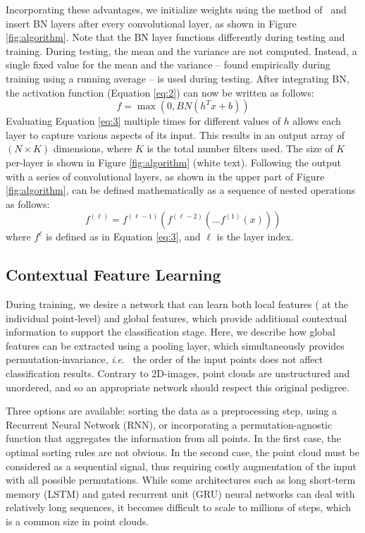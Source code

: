 \documentclass[final,3p,times,twocolumn,authoryear]{elsarticle}
\newcommand{\ie}{\textit{i}.\textit{e}.}
\begin{document}
Incorporating these advantages, we initialize weights using the method of~\citet{pmlr-glorot10a} and insert BN layers after every convolutional layer, as shown in Figure \ref{fig:algorithm}. 
Note that the BN layer functions differently during testing and training. 
During testing, the mean and the variance are not computed. 
Instead, a single fixed value for the mean and the variance -- found empirically during training using a running average -- is used during testing. 
After integrating BN, the activation function (Equation \ref{eq:2}) can now be written as follows:
\begin{equation}
\label{eq:3}
f = \max(0,BN(h^Tx+b))
\end{equation}
Evaluating Equation \ref{eq:3} multiple times for different values of $h$ allows each layer to capture various aspects of its input. 
This results in an output array of $(N\times K)$ dimensions, where $K$ is the total number filters used. 
The size of $K$ per-layer is shown in Figure \ref{fig:algorithm} (white text). Following the output with a series of convolutional layers, as shown in the upper part of Figure \ref{fig:algorithm}, can be defined mathematically as a sequence of nested operations as follows:
\begin{equation}
\label{eq:4}
f^{(\ell)} = f^{(\ell-1)}(f^{(\ell-2)}(...f^{(1)}(x)))
\end{equation} 
where $f^{\ell}$ is defined as in Equation \ref{eq:3}, and $\ell$ is the layer index. 
\subsection{Contextual Feature Learning}
\label{sec:contextual_feature_learning}
During training, we desire a network that can learn both local features ( at the individual point-level) and global features, which provide additional contextual information to support the classification stage. 
Here, we describe how global features can be extracted using a pooling layer, which simultaneously provides permutation-invariance, \ie~ the order of the input points does not affect classification results. 
Contrary to 2D-images, point clouds are unstructured and unordered, and so an appropriate network should respect this original pedigree. 

Three options are available: sorting the data as a preprocessing step, using a Recurrent Neural Network (RNN), or incorporating a permutation-agnostic function that aggregates the information from all points. 
In the first case, the optimal sorting rules are not obvious.
In the second case, the point cloud must be considered as a sequential signal, thus requiring costly augmentation of the input with all possible permutations. 
While some architectures such as long short-term memory (LSTM) and gated recurrent unit (GRU) neural networks can deal with relatively long sequences, it becomes difficult to scale to millions of steps, which is a common size in point clouds. 
\end{document}
